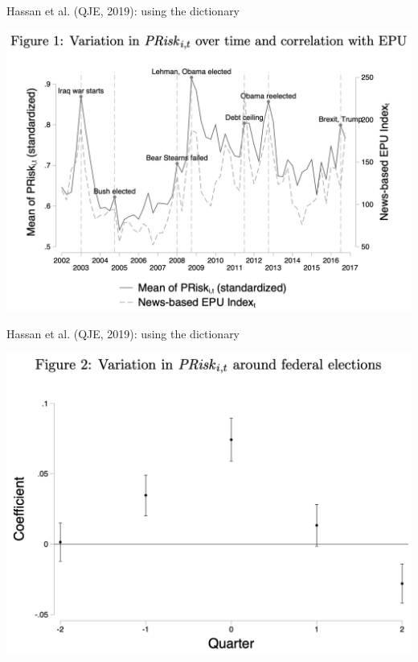 \documentclass[english]{beamer}
\begin{document}
\begin{frame}{Hassan et al. (QJE, 2019): using the dictionary}
\vspace{-7pt}
\begin{center}
\includegraphics[scale=0.38]{Images/hassan_new1.png}
\end{center}
\end{frame}

\begin{frame}{Hassan et al. (QJE, 2019): using the dictionary}
\vspace{-7pt}
\begin{center}
\includegraphics[scale=0.38]{Images/hassan_new2.png}
\end{center}
\end{frame}
\end{document}
